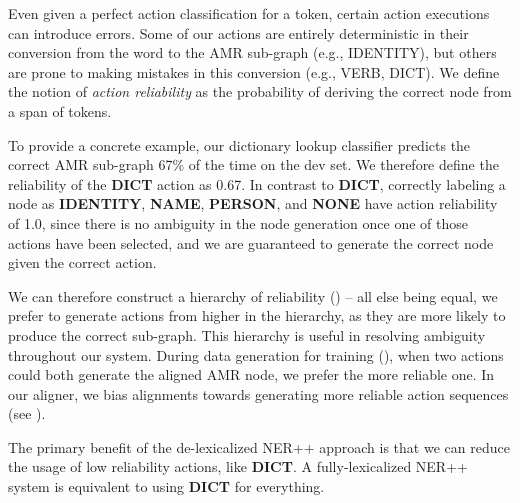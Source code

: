 \documentclass[11pt]{article}
\begin{document}
Even given a perfect action classification for a token, certain action executions can introduce errors.
Some of our actions are entirely deterministic in their conversion
  from the word to the AMR sub-graph (e.g., IDENTITY), but others are prone to
  making mistakes in this conversion (e.g., VERB, DICT).
We define the 
  notion of \textit{action reliability} as the probability of deriving the correct node from a span of tokens.

To provide a concrete example, our dictionary lookup classifier predicts the correct
  AMR sub-graph 67\% of the time on the dev set.
We therefore define the reliability of the \textbf{DICT} action as 0.67.
In contrast to \textbf{DICT}, correctly labeling a node as \textbf{IDENTITY}, \textbf{NAME}, \textbf{PERSON}, and \textbf{NONE} have 
  action reliability of 1.0, since there is no ambiguity in the node generation 
  once one of those actions have been selected, 
  and we are guaranteed to generate the correct node given the correct action.

We can therefore construct a hierarchy of reliability () -- all else being equal, we
  prefer to generate actions from higher in the hierarchy, as they are more likely
  to produce the correct sub-graph.
This hierarchy is useful in resolving ambiguity throughout our system. 
During data generation for training (), when two actions could both generate the aligned AMR node, we prefer the more reliable one.
In our aligner, we bias alignments towards generating more reliable action sequences (see ).


The primary benefit of the de-lexicalized NER++ approach is that we can reduce the usage of low reliability actions, like \textbf{DICT}. A fully-lexicalized NER++ system is equivalent to using \textbf{DICT} for everything.

%
%
\end{document}
